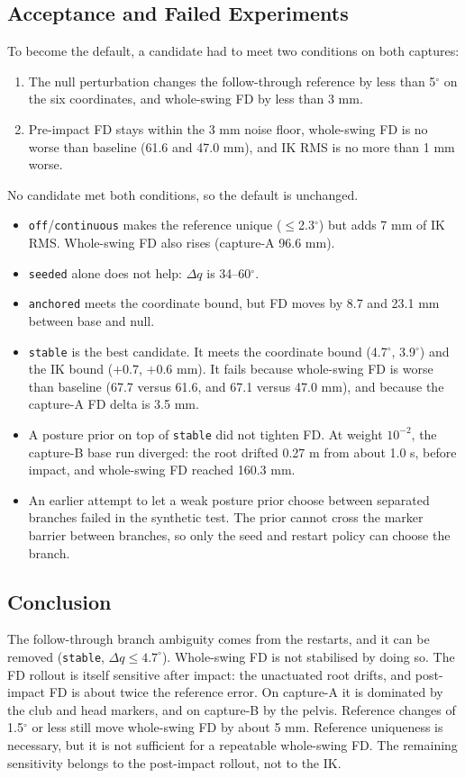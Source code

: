 \documentclass[11pt,a4paper]{article}
\begin{document}
\subsection{Acceptance and Failed Experiments}
To become the default, a candidate had to meet two conditions on both
captures:
\begin{enumerate}
\item[(a)] The null perturbation changes the follow-through reference by less
than 5$^\circ$ on the six coordinates, and whole-swing FD by less than 3 mm.
\item[(b)] Pre-impact FD stays within the 3 mm noise floor, whole-swing FD is
no worse than baseline (61.6 and 47.0 mm), and IK RMS is no more than 1 mm
worse.
\end{enumerate}
No candidate met both conditions, so the default is unchanged.
\begin{itemize}
\item \texttt{off}/\texttt{continuous} makes the reference unique
($\le$2.3$^\circ$) but adds 7 mm of IK RMS. Whole-swing FD also rises
(capture-A 96.6 mm).
\item \texttt{seeded} alone does not help: $\Delta q$ is 34--60$^\circ$.
\item \texttt{anchored} meets the coordinate bound, but FD moves by 8.7 and
23.1 mm between base and null.
\item \texttt{stable} is the best candidate. It meets the coordinate bound
(4.7$^\circ$, 3.9$^\circ$) and the IK bound ($+0.7$, $+0.6$ mm). It fails
because whole-swing FD is worse than baseline (67.7 versus 61.6, and 67.1
versus 47.0 mm), and because the capture-A FD delta is 3.5 mm.
\item A posture prior on top of \texttt{stable} did not tighten FD. At weight
$10^{-2}$, the capture-B base run diverged: the root drifted 0.27 m from about
1.0 s, before impact, and whole-swing FD reached 160.3 mm.
\item An earlier attempt to let a weak posture prior choose between separated
branches failed in the synthetic test. The prior cannot cross the marker
barrier between branches, so only the seed and restart policy can choose the
branch.
\end{itemize}

\subsection{Conclusion}
The follow-through branch ambiguity comes from the restarts, and it can be
removed (\texttt{stable}, $\Delta q \le 4.7^\circ$). Whole-swing FD is not
stabilised by doing so. The FD rollout is itself sensitive after impact: the
unactuated root drifts, and post-impact FD is about twice the reference error.
On capture-A it is dominated by the club and head markers, and on capture-B by
the pelvis. Reference changes of 1.5$^\circ$ or less still move whole-swing FD
by about 5 mm. Reference uniqueness is necessary, but it is not sufficient for
a repeatable whole-swing FD. The remaining sensitivity belongs to the
post-impact rollout, not to the IK.
\end{document}
